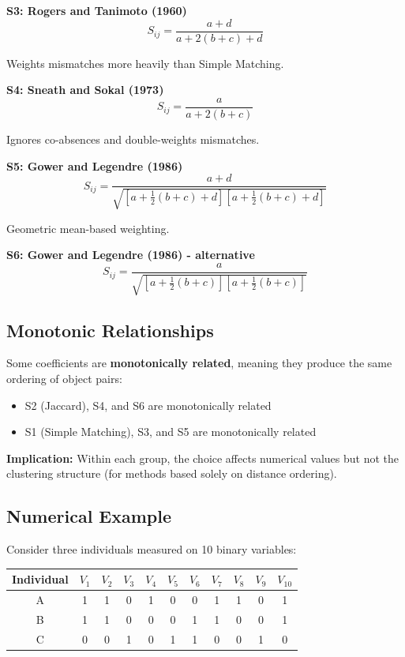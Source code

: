 \documentclass[11pt]{article}
\begin{document}
\textbf{S3: Rogers and Tanimoto (1960)}
$$S_{ij} = \frac{a+d}{a + 2(b+c) + d}$$

Weights mismatches more heavily than Simple Matching.

\textbf{S4: Sneath and Sokal (1973)}
$$S_{ij} = \frac{a}{a + 2(b+c)}$$

Ignores co-absences and double-weights mismatches.

\textbf{S5: Gower and Legendre (1986)}
$$S_{ij} = \frac{a+d}{\sqrt{[a + \frac{1}{2}(b+c) + d][a + \frac{1}{2}(b+c) + d]}}$$

Geometric mean-based weighting.

\textbf{S6: Gower and Legendre (1986) - alternative}
$$S_{ij} = \frac{a}{\sqrt{[a + \frac{1}{2}(b+c)][a + \frac{1}{2}(b+c)]}}$$

\subsection{Monotonic Relationships}

Some coefficients are \textbf{monotonically related}, meaning they produce the same ordering of object pairs:
\begin{itemize}
    \item S2 (Jaccard), S4, and S6 are monotonically related
    \item S1 (Simple Matching), S3, and S5 are monotonically related
\end{itemize}

\textbf{Implication:} Within each group, the choice affects numerical values but not the clustering structure (for methods based solely on distance ordering).

\subsection{Numerical Example}

Consider three individuals measured on 10 binary variables:

\begin{center}
\begin{tabular}{c|cccccccccc}
Individual & $V_1$ & $V_2$ & $V_3$ & $V_4$ & $V_5$ & $V_6$ & $V_7$ & $V_8$ & $V_9$ & $V_{10}$ \\
\hline
A & 1 & 1 & 0 & 1 & 0 & 0 & 1 & 1 & 0 & 1 \\
B & 1 & 1 & 0 & 0 & 0 & 1 & 1 & 0 & 0 & 1 \\
C & 0 & 0 & 1 & 0 & 1 & 1 & 0 & 0 & 1 & 0 \\
\end{tabular}
\end{center}
\end{document}
